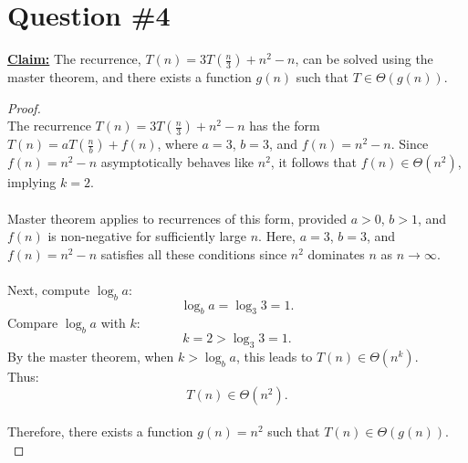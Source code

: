 \documentclass[12pt]{article}
\begin{document}
\section*{Question \#4}
\textbf{\underline{Claim:}} The recurrence, \( T(n) = 3T(\frac{n}{3}) + n^2 - n \), can be solved using the master theorem, and there exists a function \( g(n) \) such that \( T \in \Theta(g(n)) \).
\begin{proof}
\leavevmode\\
    The recurrence \( T(n) = 3T(\frac{n}{3}) + n^2 - n \) has the form \( T(n) = aT(\frac{n}{b}) + f(n) \), where \( a = 3 \), \( b = 3 \), and \( f(n) = n^2 - n \). Since \( f(n) = n^2 - n \) asymptotically behaves like \( n^2 \), it follows that \( f(n) \in \Theta(n^2) \), implying \( k = 2 \). \\
    \\
    Master theorem applies to recurrences of this form, provided \( a > 0 \), \( b > 1 \), and \( f(n) \) is non-negative for sufficiently large \( n \). Here, \( a = 3 \), \( b = 3 \), and \( f(n) = n^2 - n \) satisfies all these conditions since \( n^2 \) dominates \( n \) as \( n \to \infty \). \\
    \\
    Next, compute \( \log_b a \):
    \[
    \log_b a = \log_3 3 = 1 \text{.}
    \]
    Compare \( \log_b a \) with \( k \):
    \[
    k = 2 > \log_3 3 = 1 \text{.}
    \]
    By the master theorem, when \( k > \log_b a \), this leads to \( T(n) \in \Theta(n^k) \). \\
    Thus:
    \[
    T(n) \in \Theta(n^2) \text{.}
    \]
    \\
    Therefore, there exists a function \( g(n) = n^2 \) such that \( T(n) \in \Theta(g(n)) \). \\
\end{proof}
\pagebreak
\end{document}
